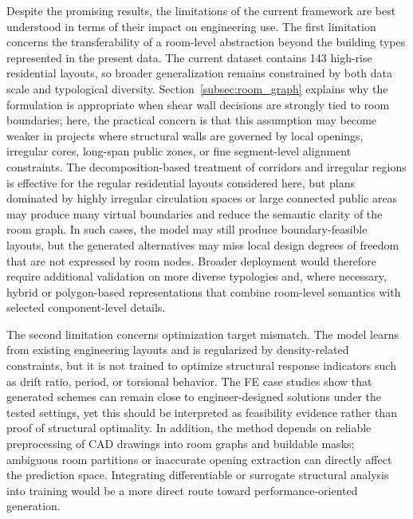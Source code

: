 Despite the promising results, the limitations of the current framework are best understood in terms of their impact on engineering use. The first limitation concerns the transferability of a room-level abstraction beyond the building types represented in the present data. The current dataset contains 143 high-rise residential layouts, so broader generalization remains constrained by both data scale and typological diversity. Section~\ref{subsec:room_graph} explains why the formulation is appropriate when shear wall decisions are strongly tied to room boundaries; here, the practical concern is that this assumption may become weaker in projects where structural walls are governed by local openings, irregular cores, long-span public zones, or fine segment-level alignment constraints. The decomposition-based treatment of corridors and irregular regions is effective for the regular residential layouts considered here, but plans dominated by highly irregular circulation spaces or large connected public areas may produce many virtual boundaries and reduce the semantic clarity of the room graph. In such cases, the model may still produce boundary-feasible layouts, but the generated alternatives may miss local design degrees of freedom that are not expressed by room nodes. Broader deployment would therefore require additional validation on more diverse typologies and, where necessary, hybrid or polygon-based representations that combine room-level semantics with selected component-level details.

The second limitation concerns optimization target mismatch. The model learns from existing engineering layouts and is regularized by density-related constraints, but it is not trained to optimize structural response indicators such as drift ratio, period, or torsional behavior. The FE case studies show that generated schemes can remain close to engineer-designed solutions under the tested settings, yet this should be interpreted as feasibility evidence rather than proof of structural optimality. In addition, the method depends on reliable preprocessing of CAD drawings into room graphs and buildable masks; ambiguous room partitions or inaccurate opening extraction can directly affect the prediction space. Integrating differentiable or surrogate structural analysis into training would be a more direct route toward performance-oriented generation.

